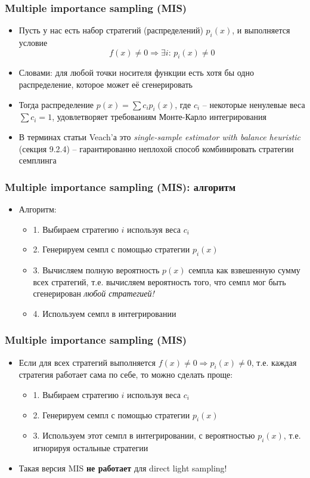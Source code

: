 \documentclass[10pt]{beamer}
\begin{document}
\begin{frame}
\frametitle{Multiple importance sampling (MIS)}
\begin{itemize}
\item Пусть у нас есть набор стратегий (распределений) \(p_i(x)\), и выполняется условие 
\begin{equation*}
f(x) \neq 0 \Longrightarrow \exists i:\, p_i(x)\neq 0
\end{equation*}
\pause
\item Словами: для любой точки носителя функции есть хотя бы одно распределение, которое может её сгенерировать
\pause
\item Тогда распределение \(p(x) = \sum c_ip_i(x)\), где \(c_i\) -- некоторые ненулевые веса \(\sum c_i = 1\), удовлетворяет требованиям Монте-Карло интегрирования
\pause
\item В терминах статьи Veach'а это \textit{single-sample estimator with balance heuristic} (секция 9.2.4) -- гарантированно неплохой способ комбинировать стратегии семплинга
\end{itemize}
\end{frame}

\begin{frame}
\frametitle{Multiple importance sampling (MIS): алгоритм}
\begin{itemize}
\item Алгоритм:
\pause
\begin{itemize}
\item 1. Выбираем стратегию \(i\) используя веса \(c_i\)
\pause
\item 2. Генерируем семпл с помощью стратегии \(p_i(x)\)
\pause
\item 3. Вычисляем полную вероятность \(p(x)\) семпла как взвешенную сумму всех стратегий, т.е. вычисляем вероятность того, что семпл мог быть сгенерирован \textit{любой стратегией!}
\pause
\item 4. Используем семпл в интегрировании
\end{itemize}
\end{itemize}
\end{frame}

\begin{frame}
\frametitle{Multiple importance sampling (MIS)}
\begin{itemize}
\item Если для всех стратегий выполняется \(f(x) \neq 0 \Longrightarrow p_i(x) \neq 0\), т.е. каждая стратегия работает сама по себе, то можно сделать проще:
\pause
\begin{itemize}
\item 1. Выбираем стратегию \(i\) используя веса \(c_i\)
\pause
\item 2. Генерируем семпл с помощью стратегии \(p_i(x)\)
\pause
\item 3. Используем этот семпл в интегрировании, с вероятностью \(p_i(x)\), т.е. игнорируя остальные стратегии
\end{itemize}
\pause
\item Такая версия MIS \textbf{не работает} для direct light sampling!
\end{itemize}
\end{frame}
\end{document}
